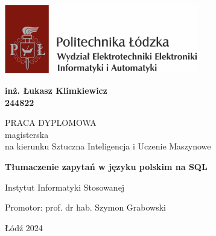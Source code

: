 \begin{titlepage}
    \raggedleft
    \includegraphics[height=3cm]{images/pl_weeia.png}
    \hfill
    
    \centering
    \vspace{48pt}
    
    {
        \large\bfseries
        inż. Łukasz Klimkiewicz
        \\
        244822
        \par
    }

    \vfill
    {
        \large PRACA DYPLOMOWA\\magisterska \\
        \small na kierunku Sztuczna Inteligencja i Uczenie Maszynowe
    }
    
    \par
    \vfill
    {
        \large\bfseries
        Tłumaczenie zapytań w języku polskim na SQL
        \par
    }

    \vfill


    \raggedright
    {
        \large
        Instytut Informatyki Stosowanej
        \par
    }
    {
        \large 
        Promotor: prof. dr hab. Szymon Grabowski
        \par
    }
    \vspace{24pt}

    \centering
    {\large Łódź 2024 \par}

\end{titlepage}
